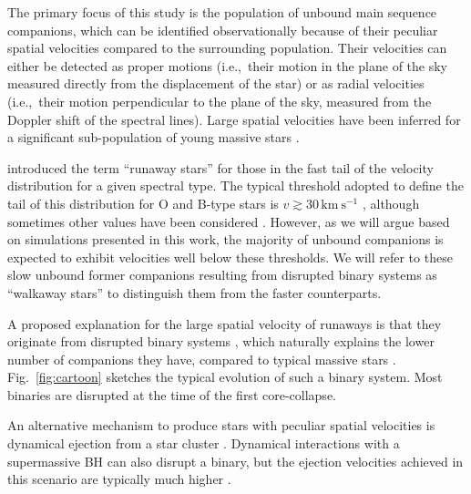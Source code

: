 \documentclass{aa}
\DeclareRobustCommand{\Figref}[1]{Fig.~\ref{#1}}
\begin{document}
The primary focus of this study is the population of unbound main sequence companions,
which can be identified observationally because of their peculiar
spatial velocities compared to the surrounding population. Their velocities can either be detected as proper
motions (i.e.,\ their motion in the plane of the sky measured directly
from the displacement of the star) or as radial velocities (i.e.,\ their
motion perpendicular to the plane of the sky, measured from the
Doppler shift of the spectral lines). Large spatial velocities have
been inferred for a significant sub-population of young massive stars
\citep[e.g.][]{blaauw:61, Cruz-Gonzalez+1974, gies:86, gies:87,
  hoogerwerf:00, hoogerwerf:01, tetzlaff:11, boubert:18}.  

\citet[][]{blaauw:61} introduced the term ``runaway stars'' for those %
in the fast tail of the velocity distribution for a given spectral type. The typical threshold
adopted to define the tail of this distribution for O and B-type stars is $v \gtrsim 30\,\mathrm{km \ s^{-1}}$
\citep[e.g.,][]{blaauw:56, gies:86, dedonder:97, hoogerwerf:00, hoogerwerf:01, dray:05, eldridge:11}, although sometimes other values
have been considered \citep[e.g., $40\,\mathrm{km\ s^{-1}}$
in][]{blaauw:61, dewit:05, boubert:18}. However, as we will argue based on simulations presented in this work, the majority of unbound companions is expected to exhibit velocities well below these thresholds.  
We will refer to these slow unbound former companions resulting from
disrupted binary systems as ``walkaway stars'' \citep[to our knowledge first coined
by][]{de-Mink+2012} to distinguish them from the faster counterparts.

A proposed explanation for the large spatial velocity of runaways is that
they originate from disrupted binary systems \citep[]{zwicky:57,
  blaauw:61, boersma:61},
which naturally explains the lower number of companions they have,
compared to typical massive stars \citep[e.g.,][]{blaauw:61, gies:86, sana:14}. \Figref{fig:cartoon} sketches the
typical evolution of such a binary system. Most binaries are disrupted
at the time of the first core-collapse.

An alternative mechanism to produce stars with peculiar spatial
velocities is dynamical ejection from a star cluster \citep[e.g.,][]{poveda:67, leonard:91, Evans+2010a,
  fujii:11, allison:12, oh:16}. Dynamical interactions with
a supermassive BH can also disrupt a binary, but the ejection
velocities achieved in this scenario are typically much higher
\citep[$\gtrsim$$10^3\,\mathrm{km\ s^{-1}}$,][]{hills:88}.
\end{document}
